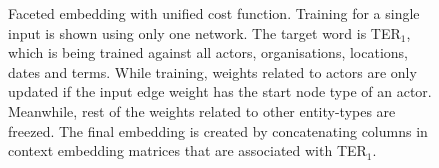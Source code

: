 \begin{figure}
{\small 
{} %

\caption{Faceted embedding with unified cost function. Training for a single input is shown using only one network. The target word is TER$_1$, which is being trained against all actors, organisations, locations, dates and terms. While training, weights related to actors are only updated if the input edge weight has the start node type of an actor. Meanwhile, rest of the weights related to other entity-types are freezed. The final embedding is created by concatenating columns in context embedding matrices that are associated with TER$_1$.} \label{fig:unified_cost}
}
\end{figure}
